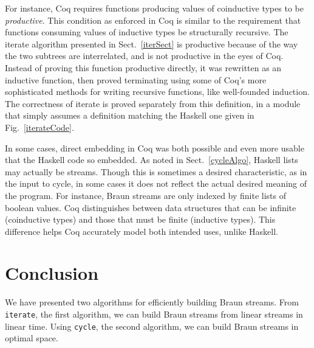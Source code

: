 \documentclass[envcountsect]{llncs}
\begin{document}
For instance, Coq requires functions producing values of coinductive types to be {\em productive}.
This condition as enforced in Coq is similar to the requirement that functions consuming values of inductive types be structurally recursive.
The iterate algorithm presented in Sect.~\ref{iterSect} is productive because of the way the two subtrees are interrelated, and is not productive in the eyes of Coq.
Instead of proving this function productive directly, it was rewritten as an inductive function, then proved terminating using some of Coq's more sophisticated methods for writing recursive functions, like well-founded induction.
The correctness of iterate is proved separately from this definition, in a module that simply assumes a definition matching the Haskell one given in Fig.~\ref{iterateCode}.

In some cases, direct embedding in Coq was both possible and even more usable that the Haskell code so embedded.
As noted in Sect.~\ref{cycleAlgo}, Haskell lists may actually be streams.
Though this is sometimes a desired characteristic, as in the input to cycle, in some cases it does not reflect the actual desired meaning of the program.
For instance, Braun streams are only indexed by finite lists of boolean values.
Coq distinguishes between data structures that can be infinite (coinductive types) and those that must be finite (inductive types).
This difference helps Coq accurately model both intended uses, unlike Haskell.


\begin{comment}
how many lines?
how many generated lines?
hiccups:
* subtraction
* repeated function application not built-in (show equal to another formulation)
\end{comment}

\section{Conclusion}
\label{conclSect}

We have presented two algorithms for efficiently building Braun streams.
From {\tt iterate}, the first algorithm, we can build Braun streams from linear streams in linear time.
Using {\tt cycle}, the second algorithm, we can build Braun streams in optimal space.
\end{document}

